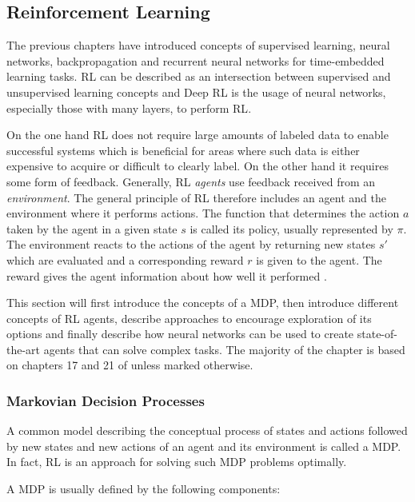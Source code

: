 \subsection{Reinforcement Learning}

The previous chapters have introduced concepts of supervised learning, neural networks, backpropagation and recurrent
neural networks for time-embedded
learning tasks. \ac{RL} can be described as an intersection between supervised and unsupervised learning concepts and
Deep \ac{RL} is the usage of neural networks, especially those with many layers, to perform \ac{RL}.

On the one hand \ac{RL}  does not require large amounts of labeled data to enable successful systems which is
beneficial for areas where such data is either expensive to acquire or difficult to clearly label. On the other hand it
requires some form of feedback. Generally, \ac{RL} \emph{agents} use feedback received from an \emph{environment}.  The
general principle of \ac{RL} therefore includes an agent and the environment where it performs actions. The function
that determines the action $a$  taken by the agent in a given state $s$ is called its policy, usually represented by
$\pi$.  The environment reacts to the actions of the agent by returning new states $s'$ which are evaluated and a
corresponding reward $r$ is given to the agent. The reward gives the agent information about how well it performed
\citep[p.830f.]{russell2016artificial}.

This section will first introduce the concepts of a \ac{MDP}, then introduce different concepts of \ac{RL} agents,
describe approaches to encourage exploration of its options and finally describe how neural networks can be used to create
state-of-the-art agents that can solve complex tasks. The majority of the chapter is based on
chapters 17 and 21 of \citet[]{russell2016artificial} unless marked otherwise.

\subsubsection{Markovian Decision Processes}%
\label{ssub:markovian_decision_processes}

A common model describing the conceptual process of states and actions followed by new states and new actions of an
agent and its environment is called a \acf {MDP}. In fact, \ac{RL} is an approach for solving such \ac{MDP} problems
optimally.

A \ac{MDP} is usually defined by the following components:

